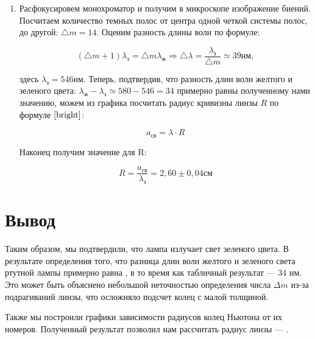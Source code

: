 \documentclass[a4paper, 12pt]{article}%
\begin{document}
\begin{enumerate}
\item Расфокусировем монохроматор и получим в микроскопе изображение биений. Посчитаем количество темных полос от центра одной четкой системы полос, до другой: $\bigtriangleup m = 14$. Оценим разность длины волн по формуле:

\[(\bigtriangleup m + 1) \lambda_{\text{з}} = \bigtriangleup m \lambda_{\text{ж}} \Rightarrow \bigtriangleup \lambda = \frac{\lambda_{\text{з}}}{\bigtriangleup m} \simeq  39 \textit{нм},\]

здесь $\lambda_{\text{з}} = 546 \textit{нм}$. Теперь, подтвердив, что разность длин волн желтого и зеленого цвета: $\lambda_{\text{ж}} - \lambda_{\text{з}} \simeq 580 - 546 = 34$ примерно равны полученному нами значению, можем из графика посчитать радиус кривизны линзы $R$ по формуле $\eqref{bright}$:

\[a_{\text{св}} = \lambda \cdot R\]

Наконец получим значение для R:

\[R = \frac{a_{\text{св}}}{\lambda_{\text{з}}} = 2,60 \pm 0,04 \text{см}\]

\end{enumerate}

\section*{Вывод}

Таким образом, мы подтвердили, что лампа излучает свет зеленого цвета. В результате определения того, что разница длин волн желтого и зеленого света ртутной лампы примерно равна , в то время как табличный результат --- 34 нм. Это может быть объяснено небольшой неточностью определения числа $ \Delta m $ из-за подрагиваний линзы, что осложняло подсчет колец с малой толщиной.
	
	Также мы построили графики зависимости радиусов колец Ньютона от их номеров. Полученный результат позволил нам рассчитать радиус линзы ---  .
\end{document}
